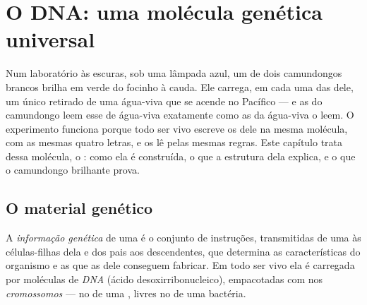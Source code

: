 \chapter{O DNA: uma molécula genética universal}\label{ch:g10:universal-dna}

Num laboratório às escuras, sob uma lâmpada azul, um de dois
camundongos brancos brilha em verde do focinho à cauda. Ele carrega, em
cada uma das  dele, um único  retirado de uma água-viva que
se acende no Pacífico --- e as  do camundongo leem esse  de
água-viva exatamente como as  da água-viva o leem. O experimento
funciona porque todo ser vivo escreve os  dele na mesma molécula,
com as mesmas quatro letras, e os lê pelas mesmas regras. Este capítulo
trata dessa molécula, o : como ela é construída, o que a estrutura
dela explica, e o que o camundongo brilhante prova.

\section{O material genético}

\begin{definition}\label{def:g10:universal-dna:information}
A \emph{informação genética} de uma  é
o conjunto de instruções, transmitidas de uma  às células-filhas
dela e dos pais aos descendentes, que determina as características do
organismo e as  que as  dele conseguem fabricar. Em
todo ser vivo ela é carregada por moléculas de \emph{DNA}
(ácido desoxirribonucleico), empacotadas com  nos
\emph{cromossomos} --- no  de uma , livres no  de uma bactéria.
\end{definition}

